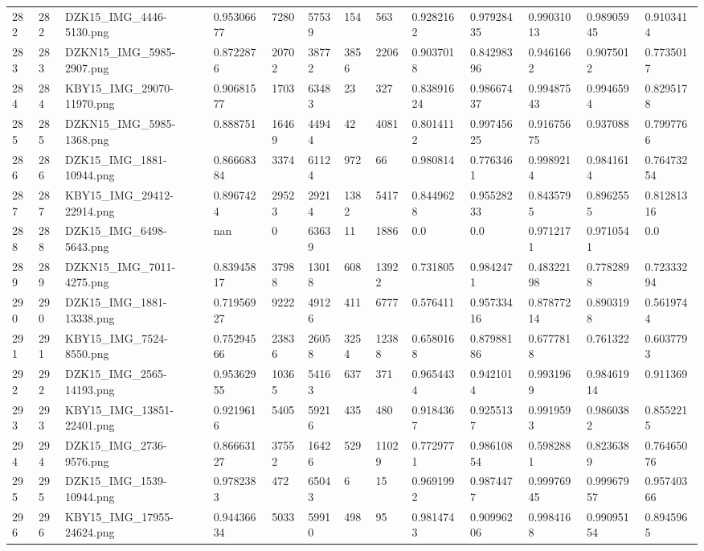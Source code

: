 \documentclass[11pt, a4paper, twoside]{report}
\begin{document}
\begin{longtable}[c]{@{}lllllllllllll@{}}
282 & 282 & DZK15\_IMG\_4446-5130.png & 0.95306677 & 7280 & 57539 & 154 & 563 & 0.9282162 & 0.97928435 & 0.99031013 & 0.98905945 & 0.9103414 \\
283 & 283 & DZKN15\_IMG\_5985-2907.png & 0.8722876 & 20702 & 38772 & 3856 & 2206 & 0.9037018 & 0.84298396 & 0.9461662 & 0.9075012 & 0.7735017 \\
284 & 284 & KBY15\_IMG\_29070-11970.png & 0.90681577 & 1703 & 63483 & 23 & 327 & 0.83891624 & 0.98667437 & 0.99487543 & 0.9946594 & 0.8295178 \\
285 & 285 & DZKN15\_IMG\_5985-1368.png & 0.888751 & 16469 & 44944 & 42 & 4081 & 0.8014112 & 0.99745625 & 0.91675675 & 0.937088 & 0.7997766 \\
286 & 286 & DZK15\_IMG\_1881-10944.png & 0.86668384 & 3374 & 61124 & 972 & 66 & 0.980814 & 0.7763461 & 0.9989214 & 0.9841614 & 0.76473254 \\
287 & 287 & KBY15\_IMG\_29412-22914.png & 0.8967424 & 29523 & 29214 & 1382 & 5417 & 0.8449628 & 0.95528233 & 0.8435795 & 0.8962555 & 0.81281316 \\
288 & 288 & DZK15\_IMG\_6498-5643.png & nan & 0 & 63639 & 11 & 1886 & 0.0 & 0.0 & 0.9712171 & 0.9710541 & 0.0 \\
289 & 289 & DZKN15\_IMG\_7011-4275.png & 0.83945817 & 37988 & 13018 & 608 & 13922 & 0.731805 & 0.9842471 & 0.48322198 & 0.7782898 & 0.72333294 \\
290 & 290 & DZK15\_IMG\_1881-13338.png & 0.71956927 & 9222 & 49126 & 411 & 6777 & 0.576411 & 0.95733416 & 0.87877214 & 0.8903198 & 0.5619744 \\
291 & 291 & KBY15\_IMG\_7524-8550.png & 0.75294566 & 23836 & 26058 & 3254 & 12388 & 0.6580168 & 0.87988186 & 0.6777818 & 0.761322 & 0.6037793 \\
292 & 292 & DZK15\_IMG\_2565-14193.png & 0.95362955 & 10365 & 54163 & 637 & 371 & 0.9654434 & 0.9421014 & 0.9931969 & 0.98461914 & 0.911369 \\
293 & 293 & KBY15\_IMG\_13851-22401.png & 0.9219616 & 5405 & 59216 & 435 & 480 & 0.9184367 & 0.9255137 & 0.9919593 & 0.9860382 & 0.8552215 \\
294 & 294 & DZK15\_IMG\_2736-9576.png & 0.86663127 & 37552 & 16426 & 529 & 11029 & 0.7729771 & 0.98610854 & 0.5982881 & 0.8236389 & 0.76465076 \\
295 & 295 & DZK15\_IMG\_1539-10944.png & 0.9782383 & 472 & 65043 & 6 & 15 & 0.9691992 & 0.9874477 & 0.99976945 & 0.99967957 & 0.95740366 \\
296 & 296 & KBY15\_IMG\_17955-24624.png & 0.94436634 & 5033 & 59910 & 498 & 95 & 0.9814743 & 0.90996206 & 0.9984168 & 0.99095154 & 0.8945965 \\

\end{longtable}
\end{document}
